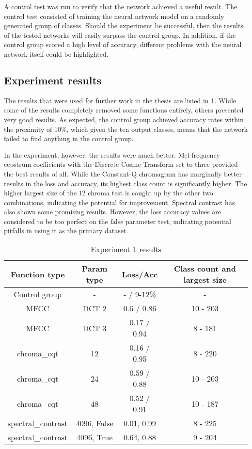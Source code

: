 A control test was run to verify that the network achieved a useful result.
The control test consisted of training the neural network model on a randomly generated group of classes.
Should the experiment be successful, then the results of the tested networks will easily surpass the control group.
In addition, if the control group scored a high level of accuracy, different problems with the neural network itself could be highlighted.

\subsection{Experiment results}

The results that were used for further work in the thesis are listed in \cref{tab:ex1results}.
While some of the results completely removed some functions entirely, others presented very good results.
As expected, the control group achieved accuracy rates within the proximity of 10\%, which given the ten output classes, means that the network failed to find anything in the control group.

In the experiment, however, the results were much better.
Mel-frequency cepstrum coefficients with the Discrete Cosine Transform set to three provided the best results of all.
While the Constant-Q chromagram has marginally better results in the loss and accuracy, its highest class count is significantly higher.
The higher largest size of the 12 chroma test is caught up by the other two combinations, indicating the potential for improvement.
Spectral contrast has also shown some promising results. 
However, the loss accuracy values are considered to be too perfect on the false parameter test, indicating potential pitfalls in using it as the primary dataset.


\begin{table}[ht]
    \centering
    \begin{tabular}{|c|c|c|c|}
        \hline
        Function type & Param type & Loss/Acc & Class count and largest size\\ \hline
        Control group & - & - / 9-12\% & - \\ \hline
        MFCC & DCT 2 & 0.6 / 0.86 & 10 - 203\\ \hline
        MFCC & DCT 3 & 0.17 / 0.94 & 8 - 181\\ \hline
        chroma\_cqt & 12 & 0.16 / 0.95 & 8 - 220\\ \hline
        chroma\_cqt & 24 & 0.59 / 0.88 & 10 - 203\\ \hline
        chroma\_cqt & 48 & 0.52 / 0.91 & 10 - 187\\ \hline
        spectral\_contrast & 4096, False & 0.01, 0.99 & 8 - 225\\ \hline
        spectral\_contrast & 4096, True & 0.64, 0.88 & 9 - 204\\ \hline
    \end{tabular}
    \caption{Experiment 1 results}
    \label{tab:ex1results}
\end{table}

